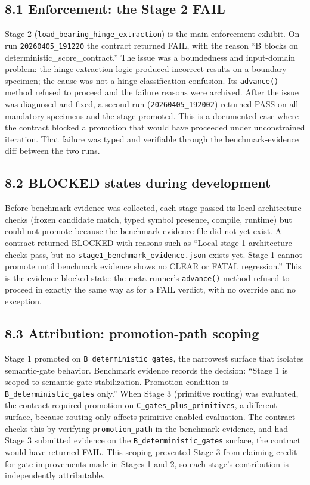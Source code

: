 \documentclass[
  11pt]{article}
\begin{document}
\subsection{8.1 Enforcement: the Stage 2
FAIL}\label{enforcement-the-stage-2-fail}

Stage 2 (\texttt{load\_bearing\_hinge\_extraction}) is the main
enforcement exhibit. On run \texttt{20260405\_191220} the contract
returned FAIL, with the reason ``B blocks on
deterministic\_score\_contract.'' The issue was a boundedness and
input-domain problem: the hinge extraction logic produced incorrect
results on a boundary specimen; the cause was not a hinge-classification
confusion. Its \texttt{advance()} method refused to proceed and the
failure reasons were archived. After the issue was diagnosed and fixed,
a second run (\texttt{20260405\_192002}) returned PASS on all mandatory
specimens and the stage promoted. This is a documented case where the
contract blocked a promotion that would have proceeded under
unconstrained iteration. That failure was typed and verifiable through
the benchmark-evidence diff between the two runs.

\subsection{8.2 BLOCKED states during
development}\label{blocked-states-during-development}

Before benchmark evidence was collected, each stage passed its local
architecture checks (frozen candidate match, typed symbol presence,
compile, runtime) but could not promote because the benchmark-evidence
file did not yet exist. A contract returned BLOCKED with reasons such as
``Local stage-1 architecture checks pass, but no
\texttt{stage1\_benchmark\_evidence.json} exists yet. Stage 1 cannot
promote until benchmark evidence shows no CLEAR or FATAL regression.''
This is the evidence-blocked state: the meta-runner's \texttt{advance()}
method refused to proceed in exactly the same way as for a FAIL verdict,
with no override and no exception.

\subsection{8.3 Attribution: promotion-path
scoping}\label{attribution-promotion-path-scoping}

Stage 1 promoted on \texttt{B\_deterministic\_gates}, the narrowest
surface that isolates semantic-gate behavior. Benchmark evidence records
the decision: ``Stage 1 is scoped to semantic-gate stabilization.
Promotion condition is \texttt{B\_deterministic\_gates} only.'' When
Stage 3 (primitive routing) was evaluated, the contract required
promotion on \texttt{C\_gates\_plus\_primitives}, a different surface,
because routing only affects primitive-enabled evaluation. The contract
checks this by verifying \texttt{promotion\_path} in the benchmark
evidence, and had Stage 3 submitted evidence on the
\texttt{B\_deterministic\_gates} surface, the contract would have
returned FAIL. This scoping prevented Stage 3 from claiming credit for
gate improvements made in Stages 1 and 2, so each stage's contribution
is independently attributable.
\end{document}
